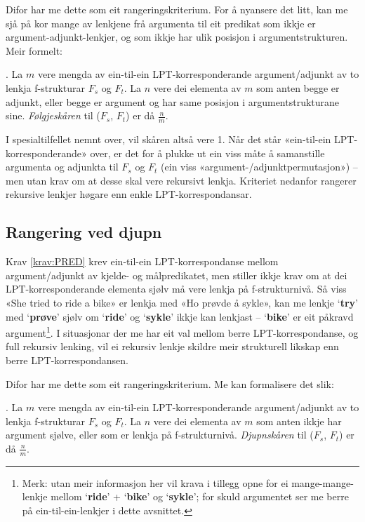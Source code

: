\documentclass[12pt,a4paper,oneside,draft]{report}
\newcommand{\p}[1]{`\textbf{#1}'}
\begin{document}
Difor har me dette som eit rangeringskriterium. For å nyansere det
 litt, kan me sjå på kor mange av lenkjene frå argumenta til eit
 predikat som ikkje er argument-adjunkt-lenkjer, og som ikkje har ulik
 posisjon i argumentstrukturen. Meir formelt:

\ex. \label{krav:arg-order-rate} La $m$ vere mengda av ein-til-ein
     LPT\hyp{}korresponderande argument/adjunkt av to lenkja f\hyp{}strukturar
     $F_s$ og $F_t$. La $n$ vere dei elementa av $m$ som anten begge
     er adjunkt, eller begge er argument og har same posisjon i
     argumentstrukturane sine. \emph{Følgjeskåren} til ($F_s$, $F_t$) er då
     $\frac{n}{m}$.

I spesialtilfellet nemnt over, vil skåren altså vere 1. Når det står
 «ein-til-ein LPT\hyp{}korresponderande» over, er det for å plukke ut
 ein viss måte å samanstille argumenta og adjunkta til $F_s$ og $F_t$
 (ein viss «argument\hyp{}/adjunktpermutasjon»)
 -- men utan krav om at desse skal vere rekursivt lenkja. Kriteriet
 nedanfor rangerer rekursive lenkjer høgare enn enkle
 LPT\hyp{}korrespondansar.

\subsection{Rangering ved djupn}
\label{sec-3.8.2}

Krav \ref{krav:PRED} krev ein-til-ein LPT\hyp{}korrespondanse mellom
 argument/adjunkt av kjelde- og målpredikatet, men stiller ikkje krav
 om at dei LPT\hyp{}korresponderande elementa sjølv må vere lenkja på
 f\hyp{}strukturnivå. Så viss «She tried to ride a bike» er lenkja med
 «Ho prøvde å sykle», kan me lenkje \p{try} med \p{prøve} sjølv om
 \p{ride} og \p{sykle} ikkje kan lenkjast -- \p{bike} er eit påkravd
 argument\footnote{Merk: utan meir informasjon her vil krava i tillegg opne for
        ei mange-mange-lenkje mellom \p{ride} + \p{bike} og \p{sykle};
        for skuld argumentet ser me berre på ein-til-ein-lenkjer i
        dette avsnittet. }. I situasjonar der me har eit val mellom berre
 LPT\hyp{}korrespondanse, og full rekursiv lenking, vil ei rekursiv
 lenkje skildre meir strukturell likskap enn berre
 LPT\hyp{}korrespondansen.

Difor har me dette som eit rangeringskriterium. Me kan formalisere det
slik:

\ex. \label{krav:sub-f-rate} La $m$ vere mengda av ein-til-ein
     LPT\hyp{}korresponderande argument/adjunkt av to lenkja f\hyp{}strukturar
     $F_s$ og $F_t$. La $n$ vere dei elementa av $m$ som anten ikkje
     har argument sjølve, eller som er lenkja på
     f\hyp{}strukturnivå. \emph{Djupnskåren} til ($F_s$, $F_t$) er då
     $\frac{n}{m}$.
\end{document}
